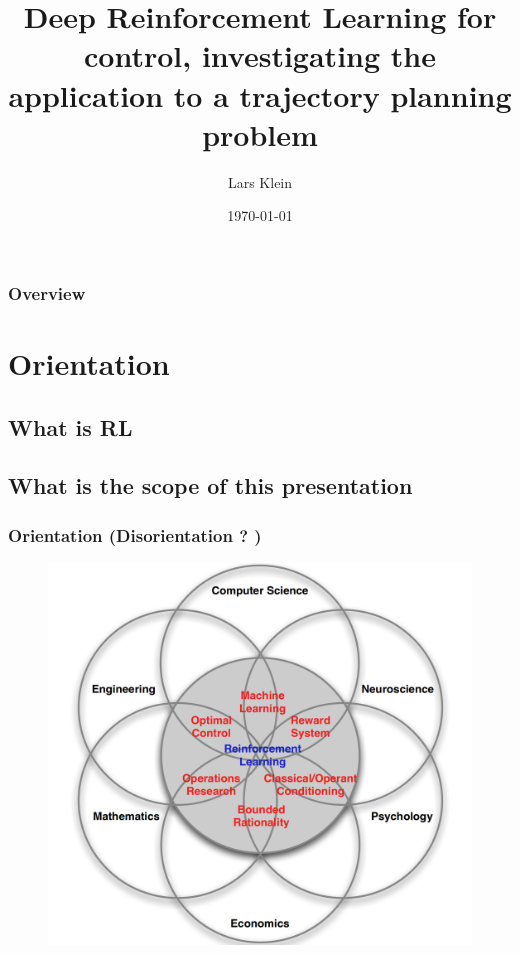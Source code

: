 \documentclass{beamer}
\title[Short title]{Deep Reinforcement Learning for control, investigating the application to a trajectory planning problem } %
\author{Lars Klein} %
\institute[PEM] %
{
RWTH \\ %
\medskip
\textit{lars.klein@rwth-aachen.de} %
}
\date{\today} %
\begin{document}
\begin{frame}
\titlepage %
\end{frame}

\begin{frame}
\frametitle{Overview} %
\tableofcontents %
\end{frame}


\section{Orientation}
\subsection{What is RL}
\subsection{What is the scope of this presentation}

\begin{frame}
\frametitle{Orientation (Disorientation ? )}
\begin{figure}
\includegraphics[height=0.7\textheight]{venn_rl}
\end{figure}
\end{frame}
\end{document}
